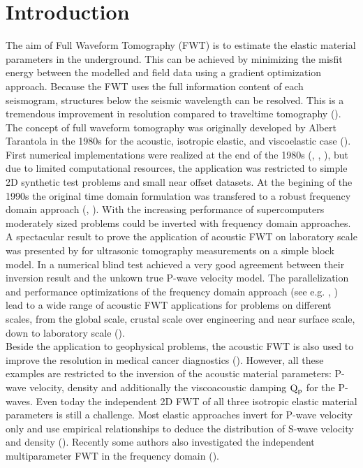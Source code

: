 
\chapter{Introduction}


The aim of Full Waveform Tomography (FWT) is to estimate the elastic material parameters in the underground. This can be achieved by minimizing the misfit energy 
between the modelled and field data using a gradient optimization approach. Because the FWT uses the full information content of each seismogram, structures below the seismic 
wavelength can be resolved. This is a tremendous improvement in resolution compared to traveltime tomography (\cite{prattgao:2002}).\\ 
The concept of full waveform tomography was originally developed by Albert Tarantola in the  1980s  for the acoustic, isotropic elastic, and 
viscoelastic case (\cite{tarantola:84a,tarantola:84,tarantola:86,tarantola:88}). First numerical implementations were realized at the end of the 1980s 
(\cite{gauthier:86}, \cite{mora:87}, \cite{pica:90}), but due to limited computational resources, the application was restricted to simple 
2D synthetic test problems and small near offset datasets. At the begining of the 1990s the original time domain formulation was transfered 
to a robust frequency domain approach (\cite{prattworth:90}, \cite{pratt:90}). With the increasing performance of supercomputers moderately 
sized problems could be inverted with frequency domain approaches.\\ A spectacular result to prove the application of acoustic FWT on laboratory scale was presented by \cite{pratt:99} for ultrasonic tomography measurements on a simple block model. In a numerical blind test \cite{brenders:2007} achieved a very good agreement between their inversion result and the unkown true P-wave velocity model. The parallelization and performance optimizations of the frequency domain approach (see e.g. \cite{sourbier:09}, \cite{sourbier:09b}) lead to a wide range of acoustic FWT applications for problems on different scales, from the global scale, crustal scale over engineering and near surface scale, down to laboratory scale (\cite{pratt:2004}).\\ Beside the application to geophysical problems, the acoustic FWT is also used to improve the resolution in medical cancer diagnostics (\cite{pratt:2007}). However, all these examples are restricted to the inversion of the acoustic material parameters: P-wave velocity, density and additionally the viscoacoustic damping $\rm{Q_p}$ for the P-waves. Even today the independent 2D FWT of all three isotropic elastic material parameters is still a challenge. Most elastic approaches invert for P-wave velocity only and use empirical relationships to deduce the distribution of S-wave velocity and density (\cite{shipp:02,sheen:06}). Recently some authors also investigated the independent multiparameter FWT in the frequency domain (\cite{choi:2008,choi:2008a,brossier:2009}).  

